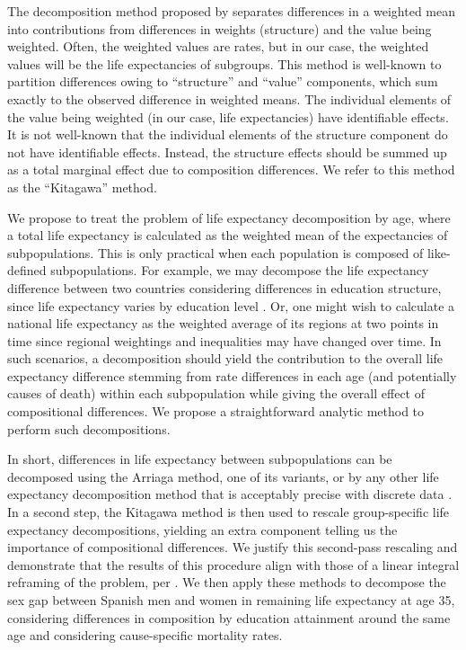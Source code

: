 \documentclass[12pt, sn-apa,pdflatex,letterpaper]{sn-jnl}
\begin{document}
The decomposition method proposed by \citet{kitagawa1955components} separates differences in a weighted mean into contributions from differences in weights (structure) and the value being weighted. Often, the weighted values are rates, but in our case, the weighted values will be the life expectancies of subgroups. This method is well-known to partition differences owing to ``structure'' and ``value'' components, which sum exactly to the observed difference in weighted means. The individual elements of the value being weighted (in our case, life expectancies) have identifiable effects. It is not well-known that the individual elements of the structure component do not have identifiable effects. Instead, the structure effects should be summed up as a total marginal effect due to composition differences. We refer to this method as the ``Kitagawa'' method.

We propose to treat the problem of life expectancy decomposition by age, where a total life expectancy is calculated as the weighted mean of the expectancies of subpopulations. This is only practical when each population is composed of like-defined subpopulations. For example, we may decompose the life expectancy difference between two countries considering differences in education structure, since life expectancy varies by education level \citep{mackenbach2019determinants, trias2023age}. Or, one might wish to calculate a national life expectancy as the weighted average of its regions at two points in time since regional weightings and inequalities may have changed over time. In such scenarios, a decomposition should yield the contribution to the overall life expectancy difference stemming from rate differences in each age (and potentially causes of death) within each subpopulation while giving the overall effect of compositional differences. We propose a straightforward analytic method to perform such decompositions.

In short, differences in life expectancy between subpopulations can be decomposed using the Arriaga method, one of its variants, or by any other life expectancy decomposition method that is acceptably precise with discrete data \citep{Ponnapalli2005,horiuchi2008decomposition,andreev2002algorithm}. In a second step, the Kitagawa method is then used to rescale group-specific life expectancy decompositions, yielding an extra component telling us the importance of compositional differences. We justify this second-pass rescaling and demonstrate that the results of this procedure align with those of a linear integral reframing of the problem, per \citet{horiuchi2008decomposition}. We then apply these methods to decompose the sex gap between Spanish men and women in remaining life expectancy at age 35, considering differences in composition by education attainment around the same age and considering cause-specific mortality rates.
\end{document}

